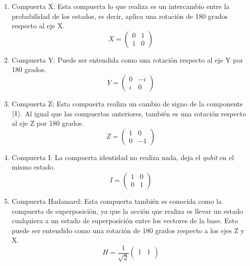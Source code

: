 \begin{enumerate}
 \item Compuerta X: Esta compuerta lo que realiza es un intercambio entre la probabilidad de los estados, es decir, aplica una rotación de 180 grados respecto al eje X.
    \begin{equation*}
    X = 
        \begin{pmatrix}
        0 & 1\\
        1 & 0
        \end{pmatrix}
    \end{equation*} 
    \item Compuerta Y: Puede ser entendida como una rotación respecto al eje Y por 180 grados.
    \begin{equation*}
    Y = 
        \begin{pmatrix}
        0 & -i\\
        i & 0
        \end{pmatrix}
    \end{equation*} 
    \item Compuerta Z: Esta compuerta realiza un cambio de signo de la componente $\ket{1}$. Al igual que las compuertas anteriores, también es una rotación respecto al eje Z por 180 grados.
    \begin{equation*}
    Z = 
        \begin{pmatrix}
        1 & 0\\
        0 & -1
        \end{pmatrix}
    \end{equation*}
    \item Compuerta I: La compuerta identidad no realiza nada, deja el \textit{qubit} en el mismo estado.
    \begin{equation*}
    I = 
        \begin{pmatrix}
        1 & 0\\
        0 & 1
        \end{pmatrix}
    \end{equation*} 
    \item Compuerta Hadamard: Esta compuerta también es conocida como la compuerta de superposición, ya que la acción que realiza es llevar un estado cualquiera a un estado de superposición entre los vectores de la base. Esto puede ser entendido como una rotación de 180 grados respecto a los ejes Z y X.
    \begin{equation*}
    H = \frac{1}{\sqrt{2}}
        \begin{pmatrix}
        1 & 1\\

\end{pmatrix}
\end{equation*}
\end{enumerate}
